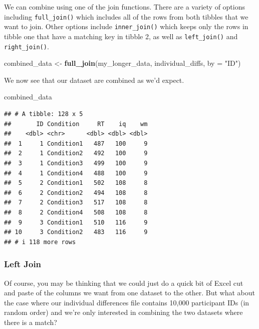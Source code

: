 \documentclass[
]{book}
\newenvironment{Shaded}{\begin{snugshade}}{\end{snugshade}}
\newcommand{\AttributeTok}[1]{\textcolor[rgb]{0.13,0.29,0.53}{#1}}
\newcommand{\FunctionTok}[1]{\textcolor[rgb]{0.13,0.29,0.53}{\textbf{#1}}}
\newcommand{\NormalTok}[1]{#1}
\newcommand{\OtherTok}[1]{\textcolor[rgb]{0.56,0.35,0.01}{#1}}
\newcommand{\StringTok}[1]{\textcolor[rgb]{0.31,0.60,0.02}{#1}}
\begin{document}
We can combine using one of the join functions. There are a variety of options including \texttt{full\_join()} which includes all of the rows from both tibbles that we want to join. Other options include \texttt{inner\_join()} which keeps only the rows in tibble one that have a matching key in tibble 2, as well as \texttt{left\_join()} and \texttt{right\_join()}.

\begin{Shaded}
\begin{Highlighting}[]
\NormalTok{combined\_data }\OtherTok{\textless{}{-}} \FunctionTok{full\_join}\NormalTok{(my\_longer\_data, individual\_diffs, }\AttributeTok{by =} \StringTok{"ID"}\NormalTok{)}
\end{Highlighting}
\end{Shaded}

We now see that our dataset are combined as we'd expect.

\begin{Shaded}
\begin{Highlighting}[]
\NormalTok{combined\_data}
\end{Highlighting}
\end{Shaded}

\begin{verbatim}
## # A tibble: 128 x 5
##       ID Condition     RT    iq    wm
##    <dbl> <chr>      <dbl> <dbl> <dbl>
##  1     1 Condition1   487   100     9
##  2     1 Condition2   492   100     9
##  3     1 Condition3   499   100     9
##  4     1 Condition4   488   100     9
##  5     2 Condition1   502   108     8
##  6     2 Condition2   494   108     8
##  7     2 Condition3   517   108     8
##  8     2 Condition4   508   108     8
##  9     3 Condition1   510   116     9
## 10     3 Condition2   483   116     9
## # i 118 more rows
\end{verbatim}

\hypertarget{left-join}{%
\subsubsection*{Left Join}\label{left-join}}

Of course, you may be thinking that we could just do a quick bit of Excel cut and paste of the columns we want from one dataset to the other. But what about the case where our individual differences file contains 10,000 participant IDs (in random order) and we're only interested in combining the two datasets where there is a match?
\end{document}
